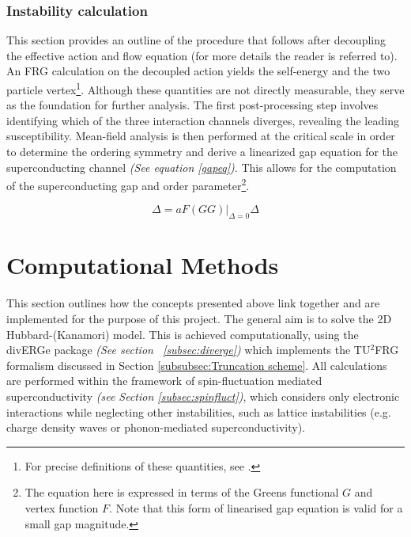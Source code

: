 \documentclass[12pt]{article}
\begin{document}
\medskip





\subsubsection{Instability calculation}

This section provides an outline of the procedure that follows after decoupling the effective action and flow equation (for more details the reader is referred to\cite{profe2023functional}). 
An FRG calculation on the decoupled action yields the self-energy and the two particle vertex\footnote{For precise definitions of these quantities, see \cite{metzner2012functional}.}.
Although these quantities are not directly measurable, they serve as the foundation for further analysis. The first post-processing step involves
identifying which of the three interaction channels diverges, revealing the leading susceptibility. Mean-field analysis\cite{reiss2007renormalized} is then performed at the critical scale in order to determine the ordering symmetry 
and derive a linearized gap equation for the superconducting channel \textit{(See equation \ref{gapeq})}\cite{profe2023functional}. This allows for the computation of 
the superconducting gap and order parameter\footnote{The equation here is expressed in terms of the Greens functional $G$ and vertex function $F$. Note that this form of linearised gap equation is valid for a small gap magnitude. }.

\begin{equation}\label{gapeq}
    \Delta = aF(GG)|_{\Delta = 0}\Delta
\end{equation}



\section{Computational Methods}

This section outlines how the concepts presented above link together and are implemented for the purpose of this project. 
The general aim is to solve the 2D Hubbard-(Kanamori) model. This is achieved computationally, using the divERGe package \textit{(See section ~\ref{subsec:diverge})} which implements the TU$^2$FRG
formalism discussed in Section \ref{subsubsec:Truncation scheme}.
All calculations are performed within the framework of spin-fluctuation mediated 
superconductivity \textit{(see Section \ref{subsec:spinfluct})}, which considers only 
electronic interactions while neglecting other instabilities, such as lattice 
instabilities (e.g. charge density waves or phonon-mediated superconductivity). 
\end{document}
